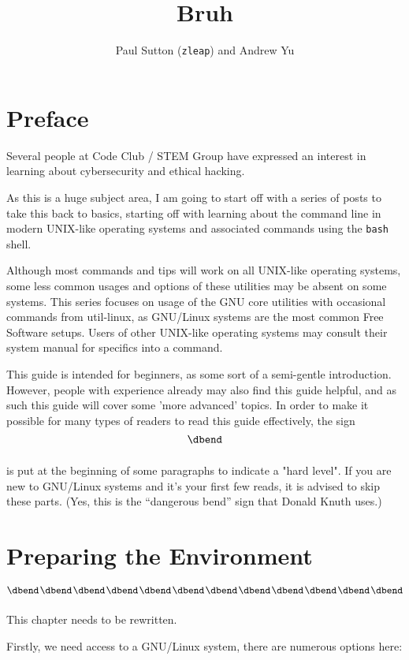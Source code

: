 \documentclass{extbook}
\title{Bruh}
\author{Paul Sutton (\texttt{zleap}) and Andrew Yu}
\begin{document}
\maketitle

\frontmatter
\chapter{Preface}

Several people at Code Club / STEM Group have expressed an interest in learning about cybersecurity and ethical hacking.

As this is a huge subject area, I am going to start off with a series of posts to take this back to basics, starting off with learning about the command line in modern UNIX-like operating systems and associated commands using the \texttt{bash} shell.

Although most commands and tips will work on all UNIX-like operating systems, some less common usages and options of these utilities may be absent on some systems.  This series focuses on usage of the GNU core utilities with occasional commands from util-linux, as GNU/Linux systems are the most common Free Software setups.  Users of other UNIX-like operating systems may consult their system manual for specifics into a command.

This guide is intended for beginners, as some sort of a semi-gentle introduction.  However, people with experience already may also find this guide helpful, and as such this guide will cover some 'more advanced' topics.  In order to make it possible for many types of readers to read this guide effectively, the  sign
$$\vbox{\hbox{\dbend}\vskip 11pt}$$
is put at the beginning of some paragraphs to indicate a "hard level".  If you are new to GNU/Linux systems and it's your first few reads, it is advised to skip these parts.  (Yes, this is the ``{dangerous bend}'' sign that Donald Knuth uses.)

\tableofcontents

\mainmatter
\chapter{Preparing the Environment}

$$\vcenter{\hbox{\dbend\kern1pt\dbend\kern1pt\dbend\kern1pt\dbend\kern1pt\dbend\kern1pt\dbend\kern1pt\dbend\kern1pt\dbend\kern1pt\dbend\kern1pt\dbend\kern1pt\dbend\kern1pt\dbend}\vskip 11pt}$$
This chapter needs to be rewritten.

Firstly, we need access to a GNU/Linux system, there are numerous options here:
\end{document}
